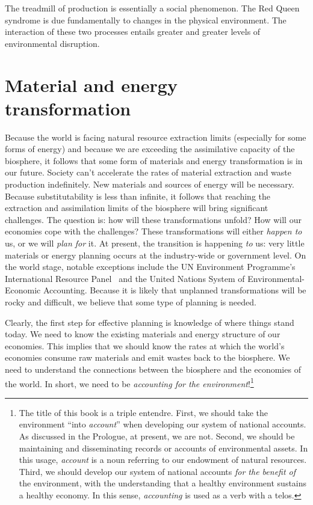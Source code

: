 The treadmill of production is essentially a social phenomenon.
The Red Queen syndrome is due fundamentally to changes in the physical environment.
The interaction of these two processes entails 
greater and greater levels of environmental disruption.


\section{Material and energy transformation}

Because the world is facing natural resource extraction limits
(especially for some forms of energy)
and because we are exceeding the assimilative capacity of the biosphere,
it follows that some form of materials and energy transformation is in our future.
Society can't accelerate the rates of material extraction
and waste production indefinitely.
New materials and sources of energy will be necessary.
Because substitutability is less than infinite, 
it follows that reaching the extraction and assimilation limits 
of the biosphere will bring significant challenges.
The question is: how will these transformations unfold?
How will our economies cope with the challenges?
These transformations will either  
\emph{happen to} us, or we will \emph{plan for} it.
At present,
the transition is happening \emph{to} us:
very little materials or energy planning occurs
at the industry-wide or government level.
On the world stage, notable exceptions include the UN Environment Programme's 
International Resource Panel~\cite{UNEP-IRP:aa}
and the United Nations System of Environmental-Economic Accounting.\cite{UNSEEA:aa}
Because it is likely that unplanned transformations will be rocky and difficult,
we believe that some type of planning is needed.

Clearly, the first step for effective planning 
is knowledge of where things stand today.
We need to know the existing materials and energy structure of our economies. 
This implies that we should know the rates at which 
the world's economies consume raw materials and emit wastes back to the biosphere.
We need to understand the connections between the biosphere and the economies of the world.
In short, we need to be \emph{accounting for the environment}!\footnote{The title 
	of this book is a triple entendre.
	First, we should take the environment ``into \emph{account}''
		when developing our system of national accounts.
		As discussed in the Prologue, at present, we are not.
	Second, we should be maintaining and disseminating
		records or accounts of environmental assets. 
		In this usage, \emph{account} is a noun
		referring to our endowment of natural resources.
	Third, we should develop our system of national accounts 
		\emph{for the benefit of} the environment, 
		with the understanding 
		that a healthy environment sustains a healthy economy.
		In this sense, \emph{accounting} is used as a verb with a telos.}

